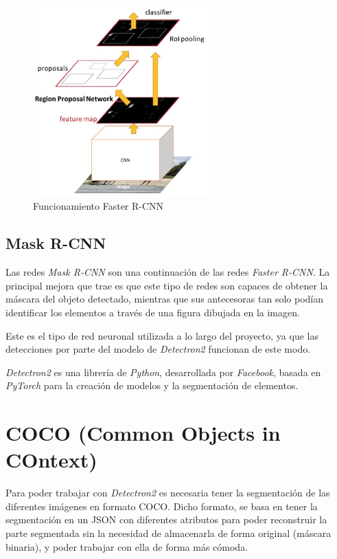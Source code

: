 \begin{figure}[h]
 \centering
  \includegraphics[width=0.6\textwidth]{img/FRCNN.png}
 \caption{Funcionamiento Faster R-CNN \cite{renNIPS15fasterrcnn}}
 \label{f:frcnn}
\end{figure}

\subsection{Mask R-CNN}
\label{mask}
Las redes \emph{Mask R-CNN} son una continuación de las redes \emph{Faster R-CNN}. La principal mejora que trae es que este tipo de redes son capaces de obtener la máscara del objeto detectado, mientras que sus antecesoras tan solo podían identificar los elementos a través de una figura dibujada en la imagen.

Este es el tipo de red neuronal utilizada a lo largo del proyecto, ya que las detecciones por parte del modelo de \emph{Detectron2} funcionan de este modo.

\emph{Detectron2} es una librería de \emph{Python}, desarrollada por \emph{Facebook}, basada en \emph{PyTorch} para la creación de modelos y la segmentación de elementos.

\section{COCO (Common Objects in COntext)}
\label{COCO}
Para poder trabajar con \emph{Detectron2} es necesaria tener la segmentación de las diferentes imágenes en formato COCO. Dicho formato, se basa en tener la segmentación en un JSON con diferentes atributos para poder reconstruir la parte segmentada sin la necesidad de almacenarla de forma original (máscara binaria), y poder trabajar con ella de forma más cómoda.

